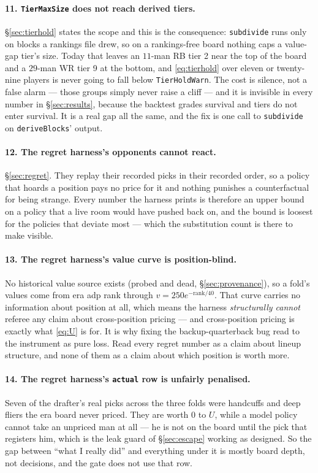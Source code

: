 \documentclass[10pt,a4paper]{article}
\theoremstyle{plain}
\theoremstyle{definition}
\theoremstyle{remark}
\newcommand{\code}[1]{\texttt{\small #1}}
\begin{document}
\paragraph{11. \code{TierMaxSize} does not reach derived tiers.}
\S\ref{sec:tierhold} states the scope and this is the consequence: \code{subdivide} runs
only on blocks a rankings file drew, so on a rankings-free board nothing caps a
value-gap tier's size. Today that leaves an $11$-man RB tier 2 near the top of the board
and a $29$-man WR tier 9 at the bottom, and \eqref{eq:tierhold} over eleven or twenty-nine
players is never going to fall below \code{TierHoldWarn}. The cost is silence, not a false
alarm --- those groups simply never raise a cliff --- and it is invisible in every number
in \S\ref{sec:results}, because the backtest grades survival and tiers do not enter
survival. It is a real gap all the same, and the fix is one call to \code{subdivide} on
\code{deriveBlocks}' output.

\paragraph{12. The regret harness's opponents cannot react.}
\S\ref{sec:regret}. They replay their recorded picks in their recorded order, so a policy
that hoards a position pays no price for it and nothing punishes a counterfactual for being
strange. Every number the harness prints is therefore an upper bound on a policy that a
live room would have pushed back on, and the bound is loosest for the policies that
deviate most --- which the substitution count is there to make visible.

\paragraph{13. The regret harness's value curve is position-blind.}
No historical value source exists (probed and dead, \S\ref{sec:provenance}), so a fold's
values come from era adp rank through $v = 250e^{-\mathrm{rank}/40}$. That curve carries no
information about position at all, which means the harness \emph{structurally cannot}
referee any claim about cross-position pricing --- and cross-position pricing is exactly
what \eqref{eq:U} is for. It is why fixing the backup-quarterback bug read to the
instrument as pure loss. Read every regret number as a claim about lineup structure, and
none of them as a claim about which position is worth more.

\paragraph{14. The regret harness's \code{actual} row is unfairly penalised.}
Seven of the drafter's real picks across the three folds were handcuffs and deep fliers the
era board never priced. They are worth $0$ to $U$, while a model policy cannot take an
unpriced man at all --- he is not on the board until the pick that registers him, which is
the leak guard of \S\ref{sec:escape} working as designed. So the gap between ``what I
really did'' and everything under it is mostly board depth, not decisions, and the gate
does not use that row.
\end{document}

